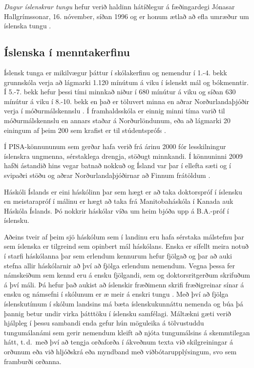 \documentclass{../../metanetpaper}
\begin{document}
\begin{multicols}{2}
\textit{Dagur íslenskrar tungu} hefur verið haldinn hátíðlegur á fæðingardegi Jónasar Hallgrímssonar, 16. nóvember, síðan 1996 og er honum ætlað að efla umræður um íslenska tungu \cite{men1}.

\subsection{Íslenska í menntakerfinu}

Íslensk tunga er mikilvægur þáttur í skólakerfinu og nemendur í 1.-4. bekk grunnskóla verja að lágmarki 1.120 mínútum á viku í íslenskt mál og bókmenntir. Í 5.-7. bekk hefur þessi tími minnkað niður í 680 mínútur á viku og síðan 630 mínútur á viku í 8.-10. bekk en það er töluvert minna en aðrar Norðurlandaþjóðir verja í móðurmálskennslu \cite{men2}. Í framhaldsskóla er einnig minni tíma varið til móðurmálskennslu en annars staðar á Norðurlöndunum, eða að lágmarki 20 einingum af þeim 200 sem krafist er til stúdentsprófs \cite{men3}. 

Í PISA-könnununum sem gerðar hafa verið frá árinu 2000 fór lesskilningur íslenskra ungmenna, sérstaklega drengja, stöðugt minnkandi. Í könnuninni 2009 hafði ástandið hins vegar batnað nokkuð og Ísland var þar í ellefta sæti og í svipaðri stöðu og aðrar Norðurlandaþjóðirnar að Finnum frátöldum \cite{nam1}.

Háskóli Íslands er eini háskólinn þar sem hægt er að taka doktorspróf í íslensku en meistarapróf í málinu er hægt að taka frá Manitobaháskóla í Kanada auk Háskóla Íslands. Þó nokkrir háskólar víða um heim bjóða upp á B.A.-próf í íslensku.

Aðeins tveir af þeim sjö háskólum sem í landinu eru hafa sérstaka málstefnu þar sem íslenska er tilgreind sem opinbert mál háskólans. Enska er sífellt meira notuð í starfi háskólanna þar sem erlendum kennurum hefur fjölgað og þar að auki stefna allir háskólarnir að því að fjölga erlendum nemendum. Vegna þessa fer námskeiðum sem kennd eru á ensku fjölgandi, sem og doktorsritgerðum skrifuðum á því máli. Þá hefur það aukist að íslenskir fræðimenn skrifi fræðigreinar sínar á ensku og námsefni í skólunum er æ meir á enskri tungu \cite{isl1}. Með því að fjölga íslenskutímum í skólum landsins má bæta íslenskukunnáttu nemenda og búa þá þannig betur undir virka þátttöku í íslensku samfélagi. Máltækni gæti verið hjálpleg í þessu sambandi enda gefur hún möguleika á tölvustuddu tungumálanámi sem gerir nemendum kleift að njóta tungumálsins á skemmtilegan hátt, t.\,d.~með því að tengja orðaforða í ákveðnum texta við skilgreiningar á orðunum eða við hljóðskrá eða myndband með viðbótarupplýsingum, svo sem framburði orðanna.


\end{multicols}
\end{document}
